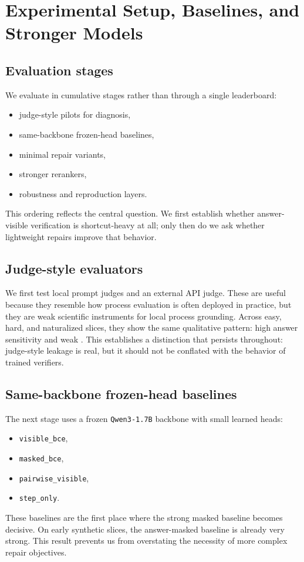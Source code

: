 \section{Experimental Setup, Baselines, and Stronger Models}

\subsection{Evaluation stages}

We evaluate in cumulative stages rather than through a single leaderboard:
\begin{itemize}[leftmargin=1.5em]
\item judge-style pilots for diagnosis,
\item same-backbone frozen-head baselines,
\item minimal repair variants,
\item stronger rerankers,
\item robustness and reproduction layers.
\end{itemize}
This ordering reflects the central question. We first establish
whether answer-visible verification is shortcut-heavy at all; only then do we
ask whether lightweight repairs improve that behavior.

\subsection{Judge-style evaluators}

We first test local prompt judges and an external API judge. These are useful
because they resemble how process evaluation is often deployed in practice, but
they are weak scientific instruments for local process grounding. Across easy,
hard, and naturalized slices, they show the same qualitative pattern: high
answer sensitivity and weak \amcd. This establishes a distinction that
persists throughout: judge-style leakage is real, but it should not
be conflated with the behavior of trained verifiers.

\subsection{Same-backbone frozen-head baselines}

The next stage uses a frozen \texttt{Qwen3-1.7B} backbone with small learned
heads:
\begin{itemize}[leftmargin=1.5em]
\item \texttt{visible\_bce},
\item \texttt{masked\_bce},
\item \texttt{pairwise\_visible},
\item \texttt{step\_only}.
\end{itemize}
These baselines are the first place where the strong masked baseline becomes
decisive. On early synthetic slices, the answer-masked baseline is already
very strong. This result prevents us from overstating the necessity of more
complex repair objectives.

